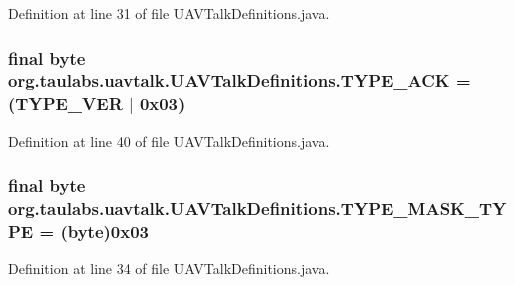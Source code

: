 \-Definition at line 31 of file \-U\-A\-V\-Talk\-Definitions.\-java.

\hypertarget{classorg_1_1taulabs_1_1uavtalk_1_1_u_a_v_talk_definitions_a2108eedbfe1b9c6fd6dbc497282b444c}{
\subsubsection[{\-T\-Y\-P\-E\-\_\-\-A\-C\-K}]{\setlength{\rightskip}{0pt plus 5cm}final byte {\bf org.\-taulabs.\-uavtalk.\-U\-A\-V\-Talk\-Definitions.\-T\-Y\-P\-E\-\_\-\-A\-C\-K} = ({\bf \-T\-Y\-P\-E\-\_\-\-V\-E\-R} $|$ 0x03)}}\label{classorg_1_1taulabs_1_1uavtalk_1_1_u_a_v_talk_definitions_a2108eedbfe1b9c6fd6dbc497282b444c}


\-Definition at line 40 of file \-U\-A\-V\-Talk\-Definitions.\-java.

\hypertarget{classorg_1_1taulabs_1_1uavtalk_1_1_u_a_v_talk_definitions_a6ccf2b527d322fdf522976dfcdae2054}{
\subsubsection[{\-T\-Y\-P\-E\-\_\-\-M\-A\-S\-K\-\_\-\-T\-Y\-P\-E}]{\setlength{\rightskip}{0pt plus 5cm}final byte {\bf org.\-taulabs.\-uavtalk.\-U\-A\-V\-Talk\-Definitions.\-T\-Y\-P\-E\-\_\-\-M\-A\-S\-K\-\_\-\-T\-Y\-P\-E} = (byte)0x03}}\label{classorg_1_1taulabs_1_1uavtalk_1_1_u_a_v_talk_definitions_a6ccf2b527d322fdf522976dfcdae2054}


\-Definition at line 34 of file \-U\-A\-V\-Talk\-Definitions.\-java.

